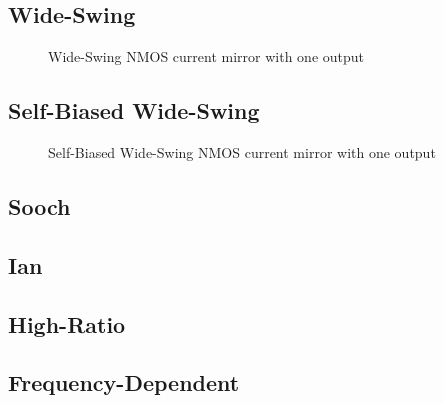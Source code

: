 \documentclass{article}[11pt]
\begin{document}
\subsection{Wide-Swing}

\begin{figure}[H]
  \centering
  \begin{circuitikz}
    
  \end{circuitikz}
  \caption{Wide-Swing NMOS current mirror with one output}
  \label{fig:ws-nmos-1}
\end{figure}


\subsection{Self-Biased Wide-Swing}

\begin{figure}[H]
  \centering
  \begin{circuitikz}
    
  \end{circuitikz}
  \caption{Self-Biased Wide-Swing NMOS current mirror with one output}
  \label{fig:sb-ws-nmos-1}
\end{figure}

\subsection{Sooch}

\cite[p. 269]{gray-anadesic-09}
\cite{sooch-casccurrmirr-85}


\subsection{Ian}

\cite{tesu-wscasccurrmirr-09}

\subsection{High-Ratio}
\cite{galupmontoro-serparmosfet-94}
\cite[section 7.2.2]{erckert-aic-22}
\cite{fiorelli-serparmosfet-04}
\cite{arnaud-subnsota-06}

\subsection{Frequency-Dependent}
\cite{itakura-fdcm-96}
\end{document}
